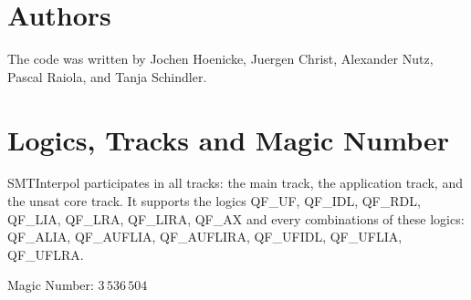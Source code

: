 \documentclass{article}
\newcommand\SI{SMTInterpol\xspace}
\begin{document}
\section*{Authors}
The code was written by Jochen Hoenicke, Juergen Christ, Alexander Nutz, 
Pascal Raiola, and Tanja Schindler.

\section*{Logics, Tracks and Magic Number}

\SI participates in all tracks: the main track, the application track,
and the unsat core track.  It supports the logics QF\_UF, QF\_IDL,
QF\_RDL, QF\_LIA, QF\_LRA, QF\_LIRA, QF\_AX and every combinations of
these logics: QF\_ALIA, QF\_AUFLIA, QF\_AUFLIRA, QF\_UFIDL, QF\_UFLIA,
QF\_UFLRA.

Magic Number: $3\,536\,504$



\end{document}
